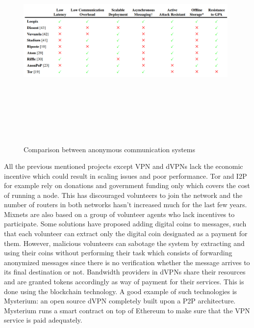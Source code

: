 \begin{figure}[H]
    \centering
    \includegraphics[width=11cm,height=11cm,keepaspectratio]{../whitepaper/images/state-of-the-art.png}
    \caption{Comparison between anonymous communication systems}
    \label{fig:Comparison between anonymous communication systems}
\end{figure}
\hspace{-5mm}All the previous mentioned projects except VPN and dVPNs lack the economic incentive which could result in scaling issues and poor performance. Tor and I2P for example rely on donations and government funding only which covers the cost of running a node. This has discouraged volunteers to join the network and the number of routers in both networks hasn't increased much for the last few years.  Mixnets are also based on a group of volunteer agents who lack incentives to participate. Some solutions have proposed adding digital coins to messages, such that each volunteer can extract only the digital coin designated as a payment for them. However, malicious volunteers can sabotage the system by extracting and using their coins without performing their task which consists of forwarding anonymized messages since there is no verification whether the message arrives to its final destination or not. Bandwidth providers in dVPNs share their resources and are granted tokens accordingly as way of payment for their services. This is done using the blockchain technology. A good example of such technologies is Mysterium: an open source dVPN completely built upon a P2P architecture. Mysterium runs a smart contract on top of Ethereum to make sure that the VPN service is paid adequately.

